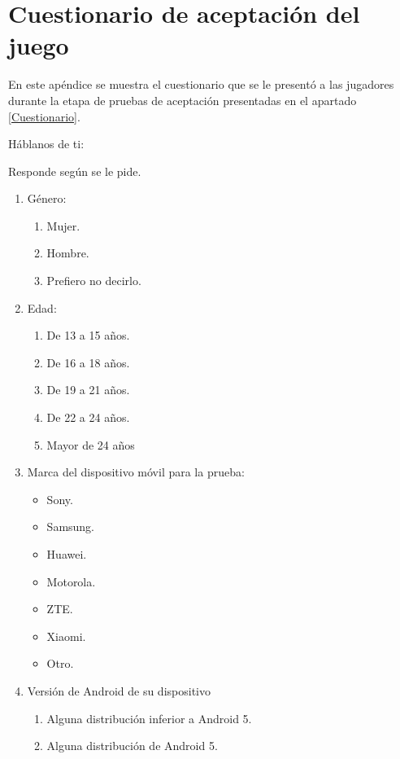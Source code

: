 \chapter{Cuestionario de aceptación del juego} \label{Anexo:Cuestionario}
En este apéndice se muestra el cuestionario que se le presentó a las jugadores durante la etapa de pruebas de aceptación presentadas en el apartado \ref{Cuestionario}.
\\
\par
Háblanos de ti:
\\
\par
Responde según se le pide.
\begin{enumerate}
    \item Género:
        \begin{enumerate}
            \item Mujer.
            \item Hombre.
            \item Prefiero no decirlo.
        \end{enumerate}
    \item Edad:
        \begin{enumerate}
            \item De 13 a 15 años.
            \item De 16 a 18 años.
            \item De 19 a 21 años.
            \item De 22 a 24 años.
            \item Mayor de 24 años
        \end{enumerate}
    \item Marca del dispositivo móvil para la prueba:
        \begin{itemize}
            \item Sony.
            \item Samsung.
            \item Huawei.
            \item Motorola.
            \item ZTE.
            \item Xiaomi.
            \item Otro.
        \end{itemize}
    \item Versión de Android de su dispositivo
        \begin{enumerate}
            \item Alguna distribución inferior a Android 5.
            \item Alguna distribución de Android 5.

\end{enumerate}
\end{enumerate}
